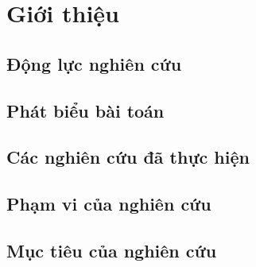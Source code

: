 \chapter{Giới thiệu}

\section{Động lực nghiên cứu}

\section{Phát biểu bài toán}

\section{Các nghiên cứu đã thực hiện}

\section{Phạm vi của nghiên cứu}

\section{Mục tiêu của nghiên cứu}